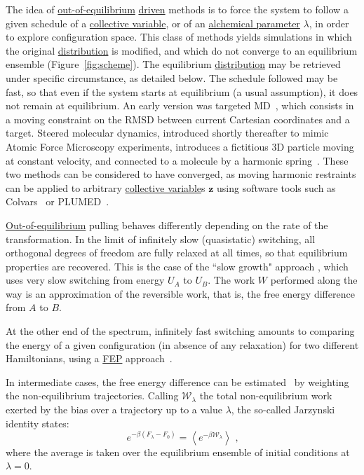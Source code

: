 \documentclass[9pt,review]{livecoms}
\newcommand{\vz}{\mathbf{z}}
\begin{document}
The idea of \hyperlink{ref:OutOfEq} {out-of-equilibrium} \hyperlink{ref:Driven} {driven} methods is to force the system to follow a given schedule of a \hyperlink{ref:CV} {collective variable}, or of an \hyperlink{ref:AuxVar} {\hyperlink{ref:Alchemical} {alchemical} parameter} $\lambda$, in order to explore configuration space. This class of methods yields simulations in which the original \hyperlink{ref:Distribution} {distribution}  is modified, and which do not converge to an equilibrium ensemble (Figure~\ref{fig:scheme}). The equilibrium \hyperlink{ref:Distribution} {distribution}  may be retrieved under specific circumstance, as detailed below. The schedule followed may be fast, so that even if the system starts at equilibrium (a usual assumption), it does not remain at equilibrium.
An early version was targeted MD~\cite{Schlitter1994}, which consists in a moving constraint on the RMSD between current Cartesian coordinates and a target.
Steered molecular dynamics, introduced shortly thereafter to mimic Atomic Force Microscopy experiments, introduces a fictitious 3D particle moving at constant velocity, and connected to a molecule by a harmonic spring~\cite{Grubmueller1996}.
These two methods can be considered to have converged, as moving harmonic restraints can be applied to arbitrary \hyperlink{ref:CV} {collective variable}s $\vz$ using software tools such as Colvars~\cite{Fiorin2013} or PLUMED~\cite{Tribello2014}.

\hyperlink{ref:OutOfEq} {Out-of-equilibrium} pulling behaves differently depending on the rate of the transformation.
In the limit of infinitely slow (quasistatic) switching, all orthogonal degrees of freedom are fully relaxed at all times, so that equilibrium properties are recovered.
This is the case of the ``slow growth" approach \cite{Postma1982}, which uses very slow switching from energy $U_A$ to $U_B$. The work $W$ performed along the way is an approximation of the reversible work, that is, the free energy difference from $A$ to $B$.

At the other end of the spectrum, infinitely fast switching amounts to comparing the energy of a given configuration (in absence of any relaxation) for two different Hamiltonians, using a \hyperlink{ref:FEP} {FEP} approach~\cite{Kirkwood1935,Zwanzig1954}.


In intermediate cases, the free energy difference can be estimated~\cite{jarzynski-97} by weighting the non-equilibrium trajectories.
Calling $\mathcal W_\lambda$ the total non-equilibrium work exerted by the bias over a trajectory up to a value $\lambda$, the so-called Jarzynski identity states:
\begin{equation}
\label{eq:jarz}
e^{-\beta (F_\lambda - F_0)} = \left\langle e^{-\beta \mathcal W_\lambda}\right\rangle \text{ ,}
\end{equation}
where the average is taken over the equilibrium ensemble of initial conditions at $\lambda = 0$.
\end{document}
